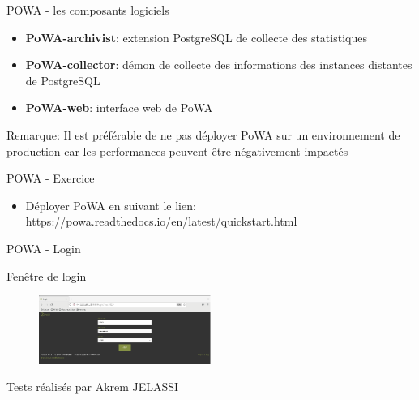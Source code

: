 
\begin{frame}{POWA - les composants logiciels}

   \begin{itemize}
      \item \textbf{PoWA-archivist}: extension PostgreSQL de collecte des statistiques
      \item \textbf{PoWA-collector}: démon de collecte des informations des instances distantes de PostgreSQL
      \item \textbf{PoWA-web}: interface web de PoWA
   \end{itemize}

   Remarque: Il est préférable de ne pas déployer PoWA sur un environnement de production car les performances peuvent être négativement impactés

\end{frame}


\begin{frame}{POWA - Exercice }

   \begin{itemize}
      \item Déployer PoWA en suivant le lien: https://powa.readthedocs.io/en/latest/quickstart.html
   \end{itemize}


\end{frame}


\begin{frame}{POWA - Login}

   Fenêtre de login

\begin{figure}
\begin{center}
\includegraphics[angle=0, width=0.5\textwidth]{images/powa_login.eps}
\end{center}
\end{figure}

   Tests réalisés par Akrem JELASSI

\end{frame}

